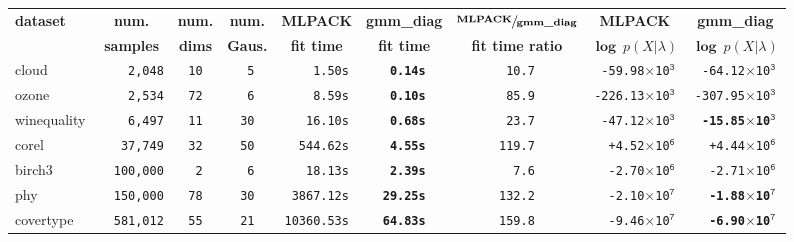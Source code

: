 \documentclass[10pt,a4paper]{article}
\begin{document}
\begin{table}[!tb]
\centering
\small
\begin{tabular}{|l|c|c|c|c|c|c|c|c|}
\hline
\multirow{2}{*}{\bfseries dataset} & {\bfseries num.}    & {\bfseries num.} & {\bfseries num.}  & {\bfseries MLPACK}   & {\bfseries {gmm\_diag}} & $\sfrac{\mbox{\bfseries MLPACK}}{\mbox{\bfseries gmm\_diag}}$ & {\bfseries MLPACK}             & {\bfseries {gmm\_diag}}        \\
                                   & {\bfseries samples} & {\bfseries dims} & {\bfseries Gaus.} & {\bfseries fit time} & {\bfseries fit time}    & {\bfseries fit time ratio}                                    & {$\mathbf \log~p(X|\lambda) $} & {$\mathbf \log~p(X|\lambda) $} \\
\hline
  cloud       & {\tt ~~~~2,048} & {\tt 10} & {\tt ~5} & {\tt ~~~~1.50s} &  {\tt\bfseries ~0.14s} & {\tt ~10.7} & {\tt~-59.98{\tiny$\times$}10$^{\mathtt 3}$} & {\tt          ~-64.12{\tiny$\times$}10$^{\mathtt 3}$} \\
  ozone       & {\tt ~~~~2,534} & {\tt 72} & {\tt ~6} & {\tt ~~~~8.59s} &  {\tt\bfseries ~0.10s} & {\tt ~85.9} & {\tt-226.13{\tiny$\times$}10$^{\mathtt 3}$} & {\tt          -307.95{\tiny$\times$}10$^{\mathtt 3}$} \\
  winequality & {\tt ~~~~6,497} & {\tt 11} & {\tt 30} & {\tt ~~~16.10s} &  {\tt\bfseries ~0.68s} & {\tt ~23.7} & {\tt~-47.12{\tiny$\times$}10$^{\mathtt 3}$} & {\tt\bfseries ~-15.85{\tiny$\times$}10$^{\mathtt 3}$} \\
  corel       & {\tt ~~~37,749} & {\tt 32} & {\tt 50} & {\tt ~~544.62s} &  {\tt\bfseries ~4.55s} & {\tt 119.7} & {\tt~~+4.52{\tiny$\times$}10$^{\mathtt 6}$} & {\tt          ~~+4.44{\tiny$\times$}10$^{\mathtt 6}$} \\
  birch3      & {\tt ~~100,000} & {\tt ~2} & {\tt ~6} & {\tt ~~~18.13s} &  {\tt\bfseries ~2.39s} & {\tt ~~7.6} & {\tt~~-2.70{\tiny$\times$}10$^{\mathtt 6}$} & {\tt          ~~-2.71{\tiny$\times$}10$^{\mathtt 6}$} \\
  phy         & {\tt ~~150,000} & {\tt 78} & {\tt 30} & {\tt ~3867.12s} &  {\tt\bfseries 29.25s} & {\tt 132.2} & {\tt~~-2.10{\tiny$\times$}10$^{\mathtt 7}$} & {\tt\bfseries ~~-1.88{\tiny$\times$}10$^{\mathtt 7}$} \\
  covertype   & {\tt ~~581,012} & {\tt 55} & {\tt 21} & {\tt 10360.53s} &  {\tt\bfseries 64.83s} & {\tt 159.8} & {\tt~~-9.46{\tiny$\times$}10$^{\mathtt 7}$} & {\tt\bfseries ~~-6.90{\tiny$\times$}10$^{\mathtt 7}$} \\

\end{tabular}
\end{table}
\end{document}
